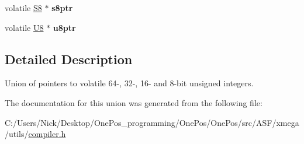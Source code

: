 \begin{DoxyCompactItemize}
\item 
\hypertarget{union_union_v_ptr_abcd674aaba4e93ab33e23fd1ed4e0326}{volatile \hyperlink{group__group__xmega__utils_gaf1475a0bb1962ef08dd1f78bd5dba87a}{S8} $\ast$ {\bfseries s8ptr}}\label{union_union_v_ptr_abcd674aaba4e93ab33e23fd1ed4e0326}

\item 
\hypertarget{union_union_v_ptr_adae0fe80c386b7283d072757309557f0}{volatile \hyperlink{group__group__xmega__utils_gaa63ef7b996d5487ce35a5a66601f3e73}{U8} $\ast$ {\bfseries u8ptr}}\label{union_union_v_ptr_adae0fe80c386b7283d072757309557f0}

\end{DoxyCompactItemize}


\subsection{Detailed Description}
Union of pointers to volatile 64-\/, 32-\/, 16-\/ and 8-\/bit unsigned integers. 

The documentation for this union was generated from the following file\-:\begin{DoxyCompactItemize}
\item 
C\-:/\-Users/\-Nick/\-Desktop/\-One\-Pos\-\_\-programming/\-One\-Pos/\-One\-Pos/src/\-A\-S\-F/xmega/utils/\hyperlink{compiler_8h}{compiler.\-h}\end{DoxyCompactItemize}
